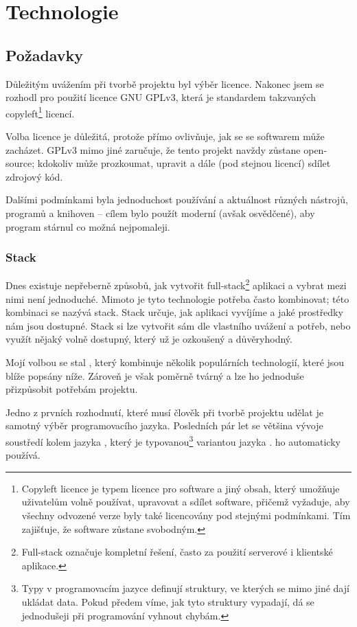 \hypertarget{Technologie}{\chapter{Technologie}}

\section{Požadavky}

Důležitým uvážením při tvorbě projektu byl výběr licence. Nakonec jsem se rozhodl pro použití licence GNU GPLv3, která je standardem takzvaných copyleft\footnote{Copyleft licence je typem licence pro software a jiný obsah, který umožňuje uživatelům volně používat, upravovat a sdílet software, přičemž vyžaduje, aby všechny odvozené verze byly také licencovány pod stejnými podmínkami. Tím zajišťuje, že software zůstane svobodným.} licencí.

Volba licence je důležitá, protože přímo ovlivňuje, jak se se softwarem může zacházet. GPLv3 mimo jiné zaručuje, že tento projekt navždy zůstane open-source; kdokoliv může prozkoumat, upravit a dále (pod stejnou licencí) sdílet zdrojový kód.\cite{choosealicense}

Dalšími podmínkami byla jednoduchost používání a aktuálnost různých nástrojů, programů a knihoven -- cílem bylo použít moderní (avšak osvědčené), aby program stárnul co možná nejpomaleji.

\subsection{Stack}

Dnes existuje nepřeberně způsobů, jak vytvořit full-stack\footnote{Full-stack označuje kompletní řešení, často za použití serverové i klientské aplikace.} aplikaci a vybrat mezi nimi není jednoduché. Mimoto je tyto technologie potřeba často kombinovat; této kombinaci se nazývá stack. Stack určuje, jak aplikaci vyvíjíme a jaké prostředky nám jsou dostupné. Stack si lze vytvořit sám dle vlastního uvážení a potřeb, nebo využít nějaký volně dostupný, který už je ozkoušený a důvěryhodný.

Mojí volbou se stal , který kombinuje několik populárních technologií, které jsou blíže popsány níže. Zároveň je však poměrně tvárný a lze ho jednoduše přizpůsobit potřebám projektu.\cite{t3stack}

Jedno z prvních rozhodnutí, které musí člověk při tvorbě projektu udělat je samotný výběr programovacího jazyka. Posledních pár let se většina vývoje soustředí kolem jazyka , který je typovanou\footnote{Typy v programovacím jazyce definují struktury, ve kterých se mimo jiné dají ukládat data. Pokud předem víme, jak tyto struktury vypadají, dá se jednodušeji při programování vyhnout chybám.} variantou jazyka .  ho automaticky používá. 


